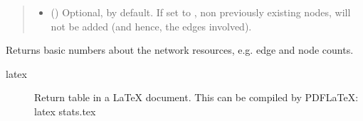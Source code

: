 \documentclass[letterpaper,10pt,english]{sphinxmanual}
\begin{document}
\begin{fulllineitems}
\begin{fulllineitems}
\begin{quote}
\begin{description}
\begin{itemize}
\item {} 
 () \textendash{} Optional,  by default. If set to , non
previously existing nodes, will not be added (and hence, the
edges involved).

\end{itemize}

\end{description}\end{quote}

\end{fulllineitems}


\begin{fulllineitems}
\label{\detokenize{main:pypath.main.PyPath.basic_stats}}
Returns basic numbers about the network resources, e.g. edge and
node counts.
\begin{description}
\item[{latex}] \leavevmode
Return table in a LaTeX document. This can be compiled by
PDFLaTeX:
latex stats.tex

\end{description}

\end{fulllineitems}


\begin{fulllineitems}
\label{\detokenize{main:pypath.main.PyPath.basic_stats_intergroup}}
\end{fulllineitems}



\end{fulllineitems}
\end{document}
